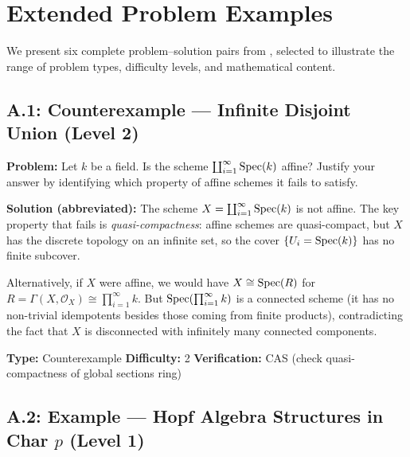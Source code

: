 \section{Extended Problem Examples}
\label{app:examples}

We present six complete problem--solution pairs from \ecagbench{}, selected to illustrate the range of problem types, difficulty levels, and mathematical content.

\subsection*{A.1: Counterexample --- Infinite Disjoint Union (Level 2)}

\begin{problembox}[title={\ecagid{0024} --- Basic Concepts}]
\textbf{Problem:} Let $k$ be a field. Is the scheme $\coprod_{i=1}^{\infty} \operatorname{Spec}(k)$ affine? Justify your answer by identifying which property of affine schemes it fails to satisfy.

\medskip
\textbf{Solution (abbreviated):}
The scheme $X = \coprod_{i=1}^{\infty} \operatorname{Spec}(k)$ is not affine.
The key property that fails is \emph{quasi-compactness}: affine schemes are quasi-compact, but $X$ has the discrete topology on an infinite set, so the cover $\{U_i = \operatorname{Spec}(k)\}$ has no finite subcover.

Alternatively, if $X$ were affine, we would have $X \cong \operatorname{Spec}(R)$ for $R = \Gamma(X, \mathcal{O}_X) \cong \prod_{i=1}^{\infty} k$.
But $\operatorname{Spec}(\prod_{i=1}^{\infty} k)$ is a connected scheme (it has no non-trivial idempotents besides those coming from finite products), contradicting the fact that $X$ is disconnected with infinitely many connected components.

\medskip
\textbf{Type:} Counterexample \quad \textbf{Difficulty:} 2 \quad \textbf{Verification:} CAS (check quasi-compactness of global sections ring)
\end{problembox}

\subsection*{A.2: Example --- Hopf Algebra Structures in Char $p$ (Level 1)}

